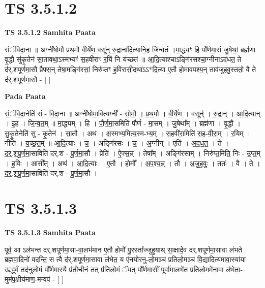 \documentclass[17pt]{extarticle}
\begin{document}

\section{ TS 3.5.1.2 }

\textbf{TS 3.5.1.2 } \newline
\textbf{Samhita Paata} \newline

संॅविदा॒ना ॥ अग्नी॑षोमौ प्रथ॒मौ वी॒र्ये॑ण॒ वसू᳚न् रु॒द्राना॑दि॒त्यानि॒ह जि॑न्वतं ।मा॒द्ध्यꣳ हि पौ᳚र्णमा॒सं जु॒षेथां॒ ब्रह्म॑णा वृ॒द्धौ सु॑कृ॒तेन॑ सा॒तावथा॒ऽस्मभ्यꣳ॑ स॒हवी॑राꣳ र॒यिं नि य॑च्छतं ॥ आ॒दि॒त्याश्चाऽङ्गि॑रसश्चा॒ग्नीनाऽद॑धत॒ ते द॑र्.शपूर्णमा॒सौ प्रैफ्स॒न् तेषा॒मङ्गि॑रसां॒ निरु॑प्तꣳ ह॒विरासी॒दथा॑ऽऽ*दि॒त्या ए॒तौ होमा॑वपश्य॒न् ताव॑जुहवु॒स्ततो॒ वै ते द॑र्.शपूर्णमा॒सौ - [  ] \newline

\textbf{Pada Paata} \newline

सं॒ॅवि॒दा॒नेति॑ सं - वि॒दा॒ना ॥ अग्नी॑षोमा॒वित्यग्नी᳚ - सो॒मौ॒ । प्र॒थ॒मौ । वी॒र्ये॑ण । वसून्॑ । रु॒द्रान् । आ॒दि॒त्यान् । इ॒ह । जि॒न्व॒त॒म् ॥ मा॒द्ध्यम् । हि । पौ॒र्ण॒मा॒समिति॑ पौर्ण - मा॒सम् । जु॒षेथा᳚म् । ब्रह्म॑णा । वृ॒द्धौ । सु॒कृ॒तेनेति॑ सु - कृ॒तेन॑ । सा॒तौ । अथ॑ । अ॒स्मभ्य॒मित्य॒स्म-भ्य॒म् । स॒हवी॑रा॒मिति॑ स॒ह-वी॒रा॒म् । र॒यिम् । नीति॑ । य॒च्छ॒त॒म् ॥ आ॒दि॒त्याः । च॒ । अङ्गि॑रसः । च॒ । अ॒ग्नीन् । एति॑ । अ॒द॒ध॒त॒ । ते । द॒र्॒.श॒पू॒र्ण॒मा॒साविति॑ दर्.श - पू॒र्ण॒मा॒सौ । प्रेति॑ । ऐ॒फ्स॒न्न् । तेषा᳚म् । अङ्गि॑रसाम् । निरु॑प्त॒मिति॒ निः - उ॒प्त॒म् । ह॒विः । आसी᳚त् । अथ॑ । आ॒दि॒त्याः । ए॒तौ । होमौ᳚ । अ॒प॒श्य॒न्न् । तौ । अ॒जु॒ह॒वुः॒ । ततः॑ । वै । ते । द॒र्॒.श॒पू॒र्ण॒मा॒साविति॑ दर्.श - पू॒र्ण॒मा॒सौ ।  \newline





\section{ TS 3.5.1.3 }

\textbf{TS 3.5.1.3 } \newline
\textbf{Samhita Paata} \newline

पूर्व॒ आ ऽल॑भन्त दर्.शपूर्णमा॒सा-वा॒लभ॑मान ए॒तौ होमौ॑ पु॒रस्ता᳚ज्जुहुयाथ् सा॒क्षादे॒व द॑र्.शपूर्णमा॒सावा ल॑भते ब्रह्मवा॒दिनो॑ वदन्ति॒ स त्वै द॑र्.शपूर्णमा॒सावा ल॑भेत॒ य ए॑नयोरनु-लो॒मञ्च॑ प्रतिलो॒मञ्च॑ वि॒द्यादित्य॑मावा॒स्या॑या ऊ॒र्द्ध्वं तद॑नुलो॒मं पौ᳚र्णमा॒स्यै प्र॑ती॒चीनं॒ तत् प्र॑तिलो॒मं ॅयत् पौ᳚र्णमा॒सीं पूर्वा॑मा॒लभे॑त प्रतिलो॒ममे॑ना॒वा ल॑भेता॒-मुम॑प॒क्षीय॑माण॒-मन्वप॑ - [  ] \newline
\end{document}
